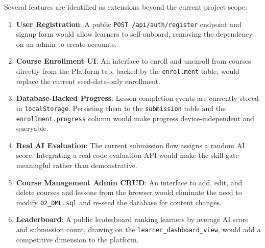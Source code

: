 \documentclass[12pt,a4paper]{article}
\begin{document}
Several features are identified as extensions beyond the current project scope:

\begin{enumerate}[label=\arabic*., itemsep=4pt]
    \item \textbf{User Registration}: A public \texttt{POST /api/auth/register} endpoint and
          signup form would allow learners to self-onboard, removing the dependency on an
          admin to create accounts.
    \item \textbf{Course Enrollment UI}: An interface to enroll and unenroll from courses
          directly from the Platform tab, backed by the \texttt{enrollment} table, would
          replace the current seed-data-only enrollment.
    \item \textbf{Database-Backed Progress}: Lesson completion events are currently stored in
          \texttt{localStorage}. Persisting them to the \texttt{submission} table and the
          \texttt{enrollment.progress} column would make progress device-independent and
          queryable.
    \item \textbf{Real AI Evaluation}: The current submission flow assigns a random AI score.
          Integrating a real code evaluation API would make the skill-gate meaningful rather
          than demonstrative.
    \item \textbf{Course Management Admin CRUD}: An interface to add, edit, and delete courses
          and lessons from the browser would eliminate the need to modify \texttt{02\_DML.sql}
          and re-seed the database for content changes.
    \item \textbf{Leaderboard}: A public leaderboard ranking learners by average AI score and
          submission count, drawing on the \texttt{learner\_dashboard\_view}, would add a
          competitive dimension to the platform.
\end{enumerate}
\end{document}
